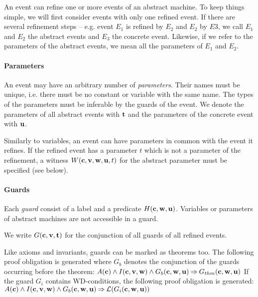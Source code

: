 An event can refine one or more events of an abstract machine. To keep things simple, we will
  first consider events with only one refined event.
If there are several refinement steps -- e.g. event $E_1$ is refined by $E_2$ and $E_2$ by
  $E3$, we call $E_1$ and $E_2$ the abstract events and $E_3$ the concrete event.
Likewise, if we refer to the parameters of the abstract events, we mean all the parameters
  of $E_1$ and $E_2$.

\paragraph{Parameters}
An event may have an arbitrary number of \emph{parameters}. Their names must be unique, i.e. there must be no constant or variable with the same name.
The types of the parameters must be inferable by the guards of the event.
We denote the parameters of all abstract events with $\mathbf{t}$ and the
parameters of the concrete event with $\mathbf{u}$.

Similarly to variables, an event can have parameters in common with the event it refines.
If the refined event has a parameter $t$ which is not a parameter of the refinement, 
a witness $W(\mathbf{c},{\mathbf{v},\mathbf{w}},\mathbf{u},t)$ for the abstract parameter must be specified (see below).

\paragraph{Guards}
\label{guards}
Each \emph{guard} consist of a label and a predicate $H(\mathbf{c},\mathbf{w},\mathbf{u})$.
Variables or parameters of abstract machines are not accessible in a guard.

We write $G(\mathbf{c},\mathbf{v},\mathbf{t})$ for the conjunction of all guards of all refined events.

Like axioms and invariants, guards can be marked as theorems too. The following
proof obligation is generated where $G_b$ denotes the conjunction of the guards occurring before the theorem:
%
{$A(\mathbf{c}) \land I(\mathbf{c},\mathbf{v},\mathbf{w}) \land G_b(\mathbf{c},\mathbf{w},\mathbf{u}) 
\mathbin\Rightarrow G_{thm}(\mathbf{c},\mathbf{w},\mathbf{u})$}
If the guard $G_i$ contains WD-conditions, the following proof obligation is generated:
%
{$A(\mathbf{c}) \land I(\mathbf{c},\mathbf{v},\mathbf{w}) \land G_b(\mathbf{c},\mathbf{w},\mathbf{u}) 
\mathbin\Rightarrow \mathcal{L}(G_i(\mathbf{c},\mathbf{w},\mathbf{u}))$}


